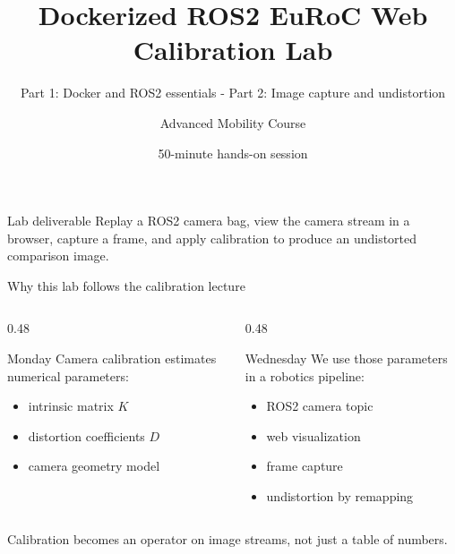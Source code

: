 \documentclass[aspectratio=169,10pt]{beamer}
\title[ROS2 EuRoC Calibration Lab]{Dockerized ROS2 EuRoC Web Calibration Lab}
\subtitle{Part 1: Docker and ROS2 essentials - Part 2: Image capture and undistortion}
\author{Advanced Mobility Course}
\date{50-minute hands-on session}
\begin{document}
\begin{frame}
  \titlepage
  \vspace{-1.0em}
  \begin{block}{Lab deliverable}
    Replay a ROS2 camera bag, view the camera stream in a browser, capture a frame, and apply calibration to produce an undistorted comparison image.
  \end{block}
\end{frame}

\begin{frame}{Why this lab follows the calibration lecture}
  \begin{columns}[T,totalwidth=\textwidth]
    \begin{column}{0.48\textwidth}
      \begin{block}{Monday}
        Camera calibration estimates numerical parameters:
        \begin{itemize}
          \item intrinsic matrix $K$
          \item distortion coefficients $D$
          \item camera geometry model
        \end{itemize}
      \end{block}
    \end{column}
    \begin{column}{0.48\textwidth}
      \begin{block}{Wednesday}
        We use those parameters in a robotics pipeline:
        \begin{itemize}
          \item ROS2 camera topic
          \item web visualization
          \item frame capture
          \item undistortion by remapping
        \end{itemize}
      \end{block}
    \end{column}
  \end{columns}
  \vspace{0.6em}
  \centering
  \large Calibration becomes an operator on image streams, not just a table of numbers.
\end{frame}
\end{document}
